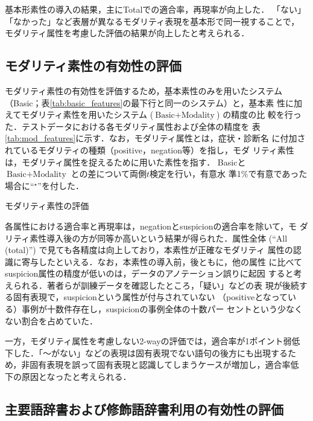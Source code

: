 \documentclass[japanese]{jnlp_1.4}
\begin{document}
基本形素性の導入の結果，主にTotalでの適合率，再現率が向上した．
「ない」「なかった」など表層が異なるモダリティ表現を基本形で同一視することで，
モダリティ属性を考慮した評価の結果が向上したと考えられる．


\subsection{モダリティ素性の有効性の評価}
\label{sec:exp_mdlfeat}

モダリティ素性の有効性を評価するため，基本素性のみを用いたシステム
（Basic；表\ref{tab:basic_features}の最下行と同一のシステム）と，基本素
性に加えてモダリティ素性を用いたシステム ($\text{Basic} + \text{Modality}$) の精度の比
較を行った．テストデータにおける各モダリティ属性および全体の精度を
表\ref{tab:mod_features}に示す．なお，モダリティ属性とは，症状・診断名
に付加されているモダリティの種類（positive，negation等）を指し，モダ
リティ素性は，モダリティ属性を捉えるために用いた素性を指す．
Basicと$\text{Basic} + \text{Modality}$ との差について両側$t$検定を行い，有意水
準1\%で有意であった場合に``$^\star$''を付した．

\begin{table}[b]
 \caption{モダリティ素性の評価}
\label{tab:mod_features}

\end{table}

各属性における適合率と再現率は，negationとsuspicionの適合率を除いて，モ
ダリティ素性導入後の方が同等か高いという結果が得られた．属性全体
 (``All (total)'') で見ても各精度は向上しており，本素性が正確なモダリティ
属性の認識に寄与したといえる．なお，本素性の導入前，後ともに，他の属性
に比べてsuspicion属性の精度が低いのは，データのアノテーション誤りに起因
すると考えられる．著者らが訓練データを確認したところ，「疑い」などの表
現が後続する固有表現で，suspicionという属性が付与されていない
（positiveとなっている）事例が十数件存在し，suspicionの事例全体の十数パー
セントという少なくない割合を占めていた．

一方，モダリティ属性を考慮しない2-wayの評価では，適合率が1ポイント弱低
下した．「〜がない」などの表現は固有表現でない語句の後方にも出現するた
め，非固有表現を誤って固有表現と認識してしまうケースが増加し，適合率低
下の原因となったと考えられる．


\subsection{主要語辞書および修飾語辞書利用の有効性の評価}
\end{document}
